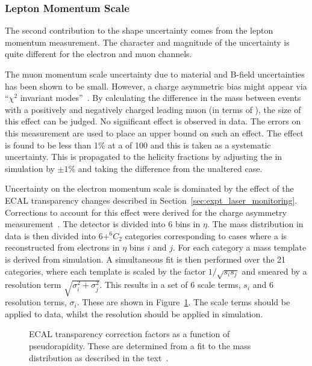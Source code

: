 \subsubsection{Lepton Momentum Scale}
The second contribution to the \LP shape uncertainty comes from the lepton
momentum measurement. The character and magnitude of the uncertainty is quite
different for the electron and muon channels.

The muon momentum scale uncertainty due to material and B-field uncertainties
has been shown to be small. However, a charge asymmetric \Pt bias might appear
via ``$\chi^2$ invariant modes''~\cite[section
2.4]{matthias_edelhoff_thesis}. By calculating the difference in the \PZ mass
between events with a positively and negatively charged leading muon (in terms
of \Pt), the size of this effect can be judged. No significant effect is
observed in data. The errors on this measurement are used to place an upper
bound on such an effect. The effect is found to be less than 1\% at a \Ptmu of
\unit{100}{\GeV} and this is taken as a systematic uncertainty. This is
propagated to the helicity fractions by adjusting the \Ptmu in simulation by
$\pm 1\%$ and taking the difference from the unaltered case.

Uncertainty on the electron momentum scale is dominated by the effect of the
\ac{ECAL} transparency changes described in
Section~\ref{sec:expt_laser_monitoring}. Corrections to account for this effect
were derived for the \PW charge asymmetry
measurement~\cite{w_charge_asymmetry}. The detector is divided into 6 bins in
$\eta$. The \Zee mass distribution in data is then divided into $6 + ^6C_2$
categories corresponding to cases where a \PZ is reconstructed from electrons in
$\eta$ bins $i$ and $j$.  For each category a mass template is derived from
simulation. A simultaneous fit is then performed over the 21 categories, where
each template is scaled by the factor $1/\sqrt{s_is_j}$ and smeared by a
resolution term $\sqrt{\sigma_i^2 + \sigma_j^2}$. This results in a set of 6
scale terms, $s_i$ and 6 resolution terms, $\sigma_i$. These are shown in
Figure~\ref{fig:wpol_ecal_transp_corr}.  The scale terms should be applied to
data, whilst the resolution should be applied in simulation.

\begin{figure}
  \centering
  \quad
  \quad
  \caption{\ac{ECAL} transparency correction factors as a function of
    pseudorapidity. These are determined from a fit to the \PZ mass distribution
    as described in the text~\cite{w_charge_asymmetry_an}.}
\label{fig:wpol_ecal_transp_corr}
\end{figure}

